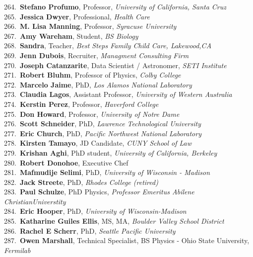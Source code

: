 264.~{\bf Stefano Profumo}, Professor, {\sl University of California, Santa Cruz } \\
265.~{\bf Jessica Dwyer}, Professional, {\sl Health Care } \\
266.~{\bf M. Lisa Manning}, Professor, {\sl Syracuse University } \\
267.~{\bf Amy Wareham}, Student, {\sl BS Biology} \\
268.~{\bf Sandra}, Teacher, {\sl Best Steps Family Child Care, Lakewood,CA} \\
269.~{\bf Jenn Dubois}, Recruiter, {\sl Managment Consulting Firm } \\
270.~{\bf Joseph Catanzarite}, Data Scientist / Astronomer, {\sl SETI Institute } \\
271.~{\bf Robert Bluhm}, Professor of Physics, {\sl Colby College} \\
272.~{\bf Marcelo Jaime}, PhD, {\sl Los Alamos National Laboratory} \\
273.~{\bf Claudia Lagos}, Assistant Professor, {\sl University of Western Australia} \\
274.~{\bf Kerstin Perez}, Professor, {\sl Haverford College} \\
275.~{\bf Don Howard}, Professor, {\sl University of Notre Dame} \\
276.~{\bf Scott Schneider}, PhD, {\sl Lawrence Technological University} \\
277.~{\bf Eric Church}, PhD, {\sl Pacific Northwest National Laboratory} \\
278.~{\bf Kirsten Tamayo}, JD Candidate, {\sl CUNY School of Law} \\
279.~{\bf Krishan Aghi}, PhD student, {\sl University of California, Berkeley} \\
280.~{\bf Robert Donohoe}, Executive Chef \\
281.~{\bf Mafmudije Selimi}, PhD, {\sl University of Wisconsin - Madison} \\
282.~{\bf Jack Streete}, PhD, {\sl Rhodes College (retired)} \\
283.~{\bf Paul Schulze}, PhD Physics, {\sl Professor Emeritus Abilene ChristianUniverstity} \\
284.~{\bf Eric Hooper}, PhD, {\sl University of Wisconsin-Madison} \\
285.~{\bf Katharine Guiles Ellis}, MS, MA, {\sl Boulder Valley School District} \\
286.~{\bf Rachel E Scherr}, PhD, {\sl Seattle Pacific University} \\
287.~{\bf Owen Marshall}, Technical Specialist, BS Physics - Ohio State University, {\sl Fermilab} \\
